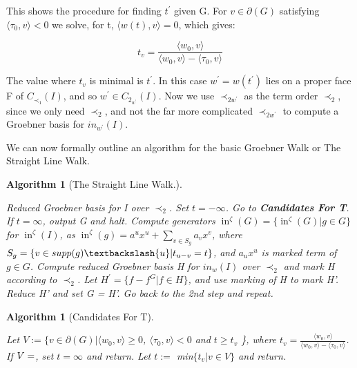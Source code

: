 \documentclass[12pt,a4paper]{report}
\newtheorem{algorithm}[theorem]{Algorithm}
\DeclareMathOperator{\initial}{in}
\begin{document}
This shows the procedure for finding $t^{'}$ given G. For $v \in \partial (G)$ satisfying $\langle \tau_{0}, v \rangle < 0$ we solve, for t, $\langle w(t), v \rangle = 0$, which gives:

\begin{equation*}
    t_{v} = \frac{\langle w_{0}, v \rangle}{\langle w_{0}, v \rangle - \langle \tau_{0}, v \rangle}
\end{equation*}

The value where $t_{v}$ is minimal is $t^{'}$. In this case $w^{'} = w(t^{'})$ lies on a proper face F of $C_{{\prec}_{1}} (I)$, and so $w^{'} \in C_{2}_{w^{'}} (I)$. Now we use $\prec_{2w^{'}}$ as the term order $\prec_{2}$, since we only need $\prec_{2}$, and not the far more complicated $\prec_{2w^{'}}$ to compute a Groebner basis for $in_{w^{'}} (I)$.

We can now formally outline an algorithm for the basic Groebner Walk or The Straight Line Walk. 


\begin{algorithm}[The Straight Line Walk.]\
 \begin{algorithmic}[1]
    \ENSURE Reduced Groebner basis for I over $\prec_{2}$.
    \STATE Set $t = - \infty$.
    \STATE Go to \textbf{Candidates For T}. If $t = \infty$, output G and halt.
    \STATE Compute generators $\initial^{\zeta} (G) = \{ \initial^{\zeta} (G) | g \in G \}$ for $\initial^{\zeta} (I)$, as $\initial^{\zeta} (g) = a^{u} x^{u} + \sum_{v \in S_{g}} a_{v} x^{v}$, where $S_{g} = \{ v \in supp(g) \textbackslash {u} | t_{u - v} = t\}$, and $a_{u} x^{u}$ is marked term of $g \in G$.
    \STATE Compute reduced Groebner basis H for $in_{w} (I)$ over $\prec_{2}$ and mark H according to $\prec_{2}$.
    \STATE Let $H^{'} = \{f - f^{G} | f \in H\}$, and use marking of H to mark H'.
    \STATE Reduce H' and set G = H'.
    \STATE Go back to the 2nd step and repeat.
\end{algorithmic}
\end{algorithm}


\begin{algorithm}[Candidates For T]\
 \begin{algorithmic}[1]
    \STATE Let $V := \{v \in \partial (G) | \langle w_{0}, v \rangle \geq 0$, $\langle \tau_{0}, v \rangle < 0$ and $t \geq t_{v}$ \}, where $t_{v} = \frac{\langle w_{0}, v \rangle}{\langle w_{0}, v \rangle - \langle \tau_{0}, v \rangle}$.
    \STATE If $V = \empty$, set $t = \infty$ and return.
    \STATE Let $t :=$ min$\{ t_{v} | v \in V\}$ and return.
    \RETURN{blbaba}
\end{algorithmic}
\end{algorithm}
\end{document}
